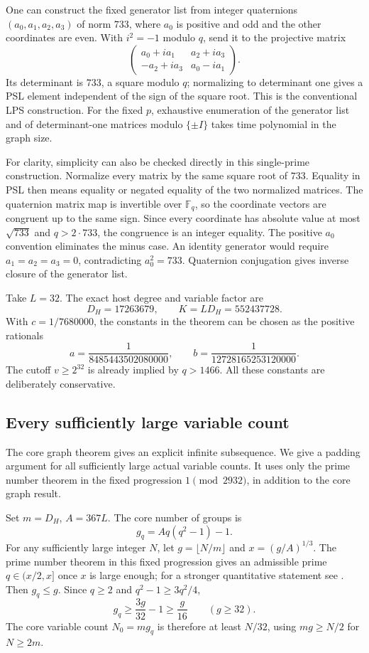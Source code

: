 \documentclass[11pt]{article}
\theoremstyle{definition}
\theoremstyle{remark}
\numberwithin{equation}{section}
\begin{document}
One can construct the fixed generator list from integer
quaternions \((a_0,a_1,a_2,a_3)\) of norm \(733\), where \(a_0\)
is positive and odd and the other coordinates are even. With
\(i^2=-1\) modulo \(q\), send it to the projective matrix
\[
 \begin{pmatrix}
   a_0+i a_1&a_2+i a_3\\
   -a_2+i a_3&a_0-i a_1
 \end{pmatrix}.
\]
Its determinant is \(733\), a square modulo \(q\); normalizing
to determinant one gives a PSL element independent of the sign
of the square root. This is the conventional LPS construction.
For the fixed \(p\), exhaustive enumeration of the generator
list and of determinant-one matrices modulo \(\{\pm I\}\)
takes time polynomial in the graph size.

For clarity, simplicity can also be checked directly in this
single-prime construction. Normalize every matrix by the same
square root of \(733\). Equality in PSL then means equality
or negated equality of the two normalized matrices. The quaternion
matrix map is invertible over \(\mathbb F_q\), so the coordinate
vectors are congruent up to the same sign. Since every coordinate
has absolute value at most \(\sqrt{733}\) and \(q>2\cdot733\),
the congruence is an integer equality. The positive \(a_0\)
convention eliminates the minus case. An identity generator
would require \(a_1=a_2=a_3=0\), contradicting \(a_0^2=733\).
Quaternion conjugation gives inverse closure of the generator list.

Take \(L=32\). The exact host degree and variable factor are
\[
 D_H=17263679,\qquad K=LD_H=552437728.
\]
With \(c=1/7680000\), the constants in the theorem can be
chosen as the positive rationals
\[
 a=\frac1{8485443502080000},\qquad
 b=\frac1{12728165253120000}.
\]
The cutoff \(v\ge2^{32}\) is already implied by \(q>1466\).
All these constants are deliberately conservative.


\subsection{Every sufficiently large variable count}\label{sub:padding}
The core graph theorem gives an explicit infinite subsequence.
We give a padding argument for all sufficiently large
actual variable counts. It uses only the prime number theorem in
the fixed progression \(1\pmod{2932}\), in addition to the core
graph result.

Set \(m=D_H\), \(A=367L\). The core number of groups is
\[
                    g_q=Aq(q^2-1)-1.
\]
For any sufficiently large integer \(N\), let
\(g=\lfloor N/m\rfloor\) and \(x=(g/A)^{1/3}\).
The prime number theorem in this fixed progression gives
an admissible prime \(q\in(x/2,x]\) once \(x\) is large enough;
for a stronger quantitative statement see \cite{ThornerZaman2021}. Then \(g_q\le g\). Since \(q\ge2\) and \(q^2-1\ge3q^2/4\),
\[
            g_q\ge\frac{3g}{32}-1\ge\frac g{16}
                     \qquad(g\ge32).
\]
The core variable count \(N_0=mg_q\) is therefore at least
\(N/32\), using \(mg\ge N/2\) for \(N\ge2m\).
\end{document}
